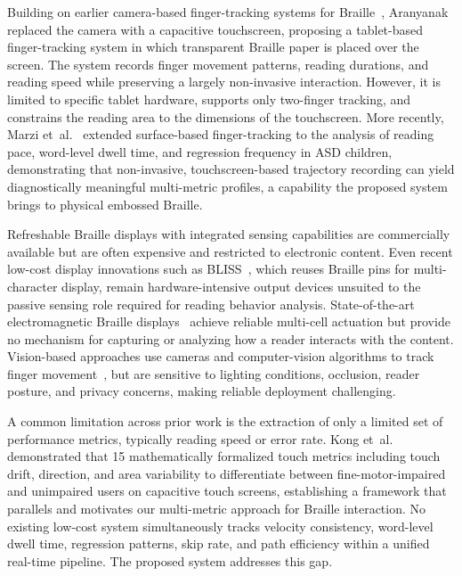 \documentclass[conference]{IEEEtran}
\begin{document}
    Building on earlier camera-based finger-tracking systems for
    Braille~\cite{rassmuscamera2006},  Aranyanak~\cite{b4} replaced
    the camera with a capacitive touchscreen, proposing a tablet-based
    finger-tracking system in which transparent Braille paper is placed
    over the screen. The system records finger movement patterns, reading
    durations, and reading speed while preserving a largely non-invasive
    interaction. However, it is limited to specific tablet hardware,
    supports only two-finger tracking, and constrains the reading area to
    the dimensions of the touchscreen. More recently, Marzi
    et~al.~\cite{marzi2022} extended surface-based finger-tracking to the
    analysis of reading pace, word-level dwell time, and regression
    frequency in ASD children, demonstrating that non-invasive,
    touchscreen-based trajectory recording can yield diagnostically
    meaningful multi-metric profiles, a capability the proposed system
    brings to physical embossed Braille.


    Refreshable Braille displays with integrated sensing capabilities are
    commercially available but are often expensive and restricted to
    electronic content. Even recent low-cost display innovations
    such as BLISS~\cite{etezad2024}, which reuses Braille pins for
    multi-character display, remain hardware-intensive output devices
    unsuited to the passive sensing role required for reading behavior
    analysis. State-of-the-art electromagnetic Braille
    displays~\cite{chen2023} achieve reliable multi-cell actuation but
    provide no mechanism for capturing or analyzing how a reader interacts
    with the content. Vision-based approaches use cameras and
    computer-vision algorithms to track finger movement~\cite{rassmuscamera2006}, but are
    sensitive to lighting conditions, occlusion, reader posture, and
    privacy concerns, making reliable deployment challenging.


    A common limitation across prior work is the extraction of only a
    limited set of performance metrics, typically reading speed or error
    rate. Kong et~al.~\cite{kong2022} demonstrated that 15 mathematically
    formalized touch metrics including touch drift, direction, and area
    variability to differentiate between fine-motor-impaired and unimpaired users on
    capacitive touch screens, establishing a framework that parallels and
    motivates our multi-metric approach for Braille interaction. No
    existing low-cost system simultaneously tracks velocity consistency,
    word-level dwell time, regression patterns, skip rate, and path
    efficiency within a unified real-time pipeline. The proposed system
    addresses this gap.
\end{document}
